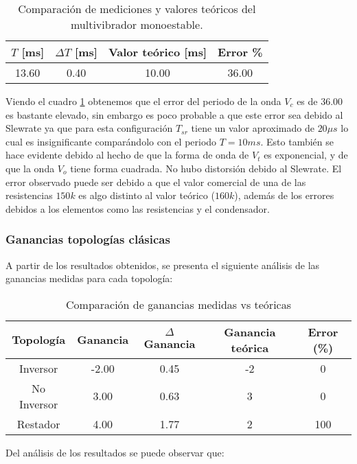 \begin{table}[ht]
\centering
\begin{tabular}{|c|c|c|c|}
\hline
\(T\) [ms] & \(\Delta T\) [ms] & Valor teórico [ms] & Error \% \\ \hline
13.60 & 0.40 & 10.00 & 36.00 \\ \hline
\end{tabular}
\caption{Comparación de mediciones y valores teóricos del multivibrador monoestable.}
\label{tab:comparacion-multivibrador-monostable}
\end{table}

Viendo el cuadro \ref{tab:comparacion-multivibrador-monostable} obtenemos que el error del periodo de la onda $V_c$ es de $36.00$ es bastante elevado, sin embargo es poco probable a que este error sea debido al Slewrate ya que para esta configuración  $T_{sr}$ tiene un valor aproximado de $20\mu s$ lo cual es insignificante comparándolo con el periodo $T=10ms$. Esto también se hace evidente debido al hecho de que la forma de onda de $V_t$ es exponencial, y de que la onda $V_o$ tiene forma cuadrada. No hubo distorsión debido al Slewrate. El error observado puede ser debido a que el valor comercial de una de las resistencias $150k$ es algo distinto al valor teórico ($160k$), además de los errores debidos a los elementos como las resistencias y el condensador.

\subsubsection{Ganancias topologías clásicas}

A partir de los resultados obtenidos, se presenta el siguiente análisis de las ganancias medidas para cada topología:

\begin{table}[ht]
\centering
\begin{tabular}{|c|c|c|c|c|}
\hline
Topología & Ganancia & $\Delta$ Ganancia & Ganancia teórica & Error (\%) \\ \hline
Inversor & -2.00 & 0.45 & -2 & 0 \\ \hline
No Inversor & 3.00 & 0.63 & 3 & 0 \\ \hline
Restador & 4.00 & 1.77 & 2 & 100 \\ \hline
\end{tabular}
\caption{Comparación de ganancias medidas vs teóricas}
\label{tab:comparacion-ganancias}
\end{table}

Del análisis de los resultados se puede observar que:

